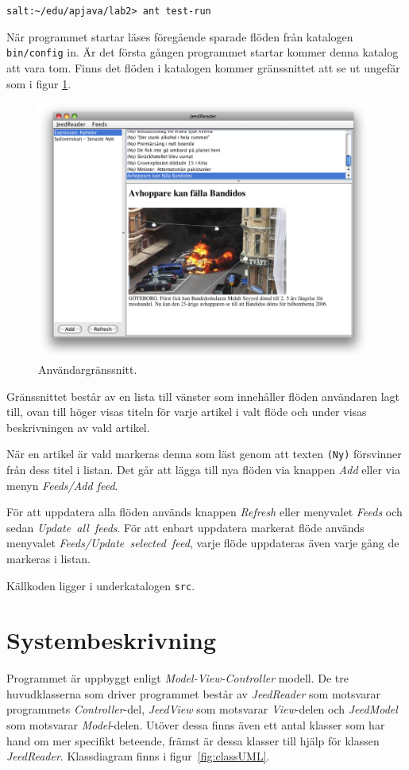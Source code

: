 \documentclass[titlepage, twoside, a4paper, 12pt]{article}
\begin{document}
\verb!salt:~/edu/apjava/lab2> ant test-run!

När programmet startar läses föregående sparade flöden från kata\-logen
\verb!bin/config! in. Är det första gången programmet startar kommer
denna katalog att vara tom. Finns det flöden i katalogen kommer
gränssnittet att se ut ungefär som i figur \ref{fig:gui-out}.

\begin{figure}[H]
  \begin{center}
    \includegraphics[width=110mm]{images/gui-out.png}
    \caption{Användargränssnitt.}
    \label{fig:gui-out}
  \end{center}
\end{figure}

Gränssnittet består av en lista till vänster som innehåller flöden
användaren lagt till, ovan till höger visas titeln för varje artikel i
valt flöde och under visas beskrivningen av vald artikel.

När en artikel är vald markeras denna som läst genom att texten
\verb!(Ny)! försvinner från dess titel i listan. Det går att lägga
till nya flöden via knappen \textit{Add} eller via menyn
\textit{Feeds/Add feed}.

För att uppdatera alla flöden används knappen \textit{Refresh} eller
menyvalet \textit{Feeds} och sedan \textit{Update~all~feeds}. För att
enbart uppdatera markerat flöde används menyvalet
\textit{Feeds/Update~selected~feed}, varje flöde uppdateras även varje
gång de markeras i listan.

Källkoden ligger i underkatalogen \verb!src!.

\section{Systembeskrivning}\label{Systembeskrivning}
Programmet är uppbyggt enligt \textit{Model-View-Controller}
modell. De tre huvudklasserna som driver programmet består av
\textit{JeedReader} som motsvarar programmets \textit{Controller}-del,
\textit{JeedView} som motsvarar \textit{View}-delen och
\textit{JeedModel} som motsvarar \textit{Model}-delen. Utöver dessa
finns även ett antal klasser som har hand om mer specifikt beteende,
främst är dessa klasser till hjälp för klassen
\textit{JeedReader}. Klassdiagram finns i figur~\ref{fig:classUML}.
\end{document}
